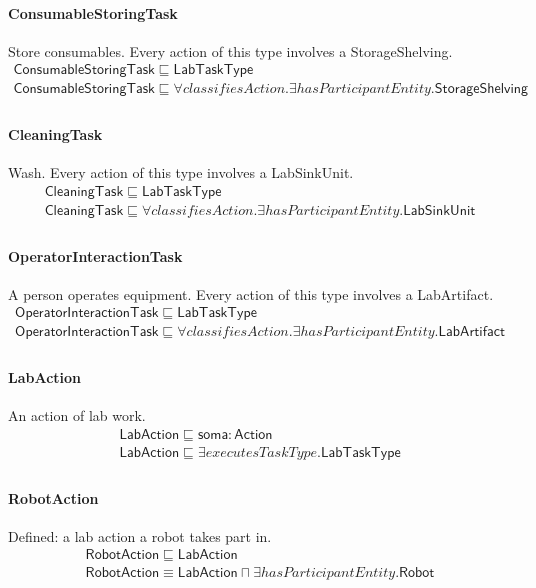 \documentclass[10pt]{article}
\begin{document}
\paragraph{ConsumableStoringTask} Store consumables. Every action of this type involves a StorageShelving.
\[\begin{array}{l}
\mathsf{ConsumableStoringTask} \sqsubseteq  \mathsf{LabTaskType} \\
\mathsf{ConsumableStoringTask} \sqsubseteq  \forall \mathit{classifiesAction}.\exists \mathit{hasParticipantEntity}.\mathsf{StorageShelving} \\
\end{array}\]
\paragraph{CleaningTask} Wash. Every action of this type involves a LabSinkUnit.
\[\begin{array}{l}
\mathsf{CleaningTask} \sqsubseteq  \mathsf{LabTaskType} \\
\mathsf{CleaningTask} \sqsubseteq  \forall \mathit{classifiesAction}.\exists \mathit{hasParticipantEntity}.\mathsf{LabSinkUnit} \\
\end{array}\]
\paragraph{OperatorInteractionTask} A person operates equipment. Every action of this type involves a LabArtifact.
\[\begin{array}{l}
\mathsf{OperatorInteractionTask} \sqsubseteq  \mathsf{LabTaskType} \\
\mathsf{OperatorInteractionTask} \sqsubseteq  \forall \mathit{classifiesAction}.\exists \mathit{hasParticipantEntity}.\mathsf{LabArtifact} \\
\end{array}\]
\paragraph{LabAction} An action of lab work.
\[\begin{array}{l}
\mathsf{LabAction} \sqsubseteq  \mathsf{soma{:}Action} \\
\mathsf{LabAction} \sqsubseteq  \exists \mathit{executesTaskType}.\mathsf{LabTaskType} \\
\end{array}\]
\paragraph{RobotAction} Defined: a lab action a robot takes part in.
\[\begin{array}{l}
\mathsf{RobotAction} \sqsubseteq  \mathsf{LabAction} \\
\mathsf{RobotAction} \equiv  \mathsf{LabAction} \sqcap  \exists \mathit{hasParticipantEntity}.\mathsf{Robot} \\
\end{array}\]
\end{document}
